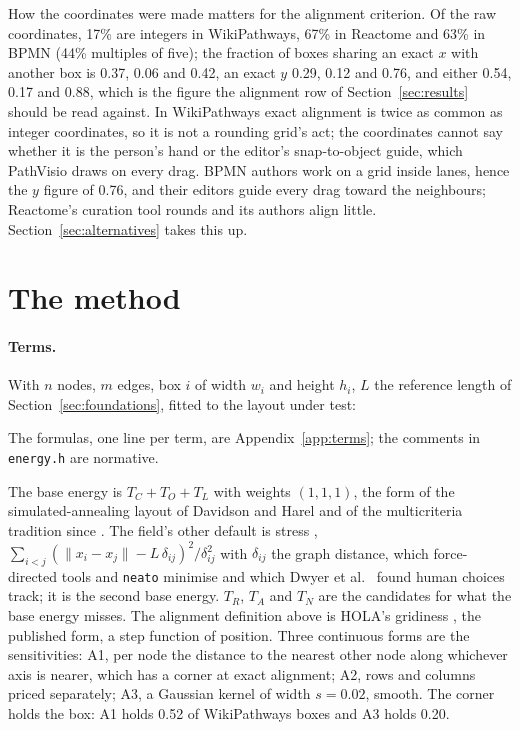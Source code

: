 \documentclass[a4paper,UKenglish]{gd-lipics-v3}
\begin{document}
How the coordinates were made matters for the alignment criterion. Of the raw coordinates,
17\% are integers in WikiPathways, 67\% in Reactome and 63\% in BPMN (44\% multiples of
five); the fraction of boxes sharing an exact $x$ with another box is 0.37, 0.06 and 0.42,
an exact $y$ 0.29, 0.12 and 0.76, and either 0.54, 0.17 and 0.88, which is the figure the
alignment row of Section~\ref{sec:results} should be read against. In WikiPathways exact
alignment is twice as common as integer coordinates, so it is not a rounding grid's act;
the coordinates cannot say whether it is the person's hand or the editor's snap-to-object
guide, which PathVisio draws on every drag. BPMN authors work on a grid inside
lanes, hence the $y$ figure of 0.76, and their editors guide every
drag toward the neighbours; Reactome's curation tool rounds and its authors align little.
Section~\ref{sec:alternatives} takes this up.

\section{The method}\label{sec:method}


\paragraph{Terms.} With $n$ nodes, $m$ edges, box $i$ of width $w_i$ and height $h_i$, $L$
the reference length of Section~\ref{sec:foundations}, fitted to the layout under test:

The formulas, one line per term, are Appendix~\ref{app:terms};
the comments in \texttt{energy.h} are normative.

The base energy is $T_C + T_O + T_L$ with weights $(1,1,1)$, the form of the
simulated-annealing layout of Davidson and Harel \cite{dh96} and of the multicriteria
tradition since \cite{ahmed20}. The field's other default is stress \cite{kamada89,
gansner05}, $\sum_{i<j} (\|x_i - x_j\| - L\,\delta_{ij})^2 / \delta_{ij}^2$ with
$\delta_{ij}$ the graph distance, which force-directed tools and \texttt{neato} minimise
and which Dwyer et al.\ \cite{dwyer09} found human choices track; it is the second base
energy. $T_R$, $T_A$ and $T_N$ are the candidates for what the
base energy misses. The alignment definition above is HOLA's gridiness \cite{hola16}, the
published form, a step function of position. Three continuous forms are the sensitivities:
A1, per node the distance to the nearest other node along whichever axis is nearer, which
has a corner at exact alignment; A2, rows and columns priced separately; A3, a Gaussian
kernel of width $s = 0.02$, smooth. The corner holds the box: A1 holds 0.52 of
WikiPathways boxes and A3 holds 0.20.
\end{document}
